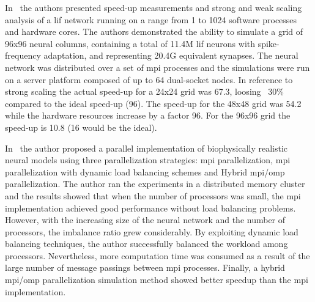 \documentclass[10pt,journal,compsoc]{IEEEtran}
\begin{document}
In~\cite{Pastorelli2015ScalingT1} the authors presented speed-up measurements and strong and weak scaling analysis of a \gls{lif} network running on a range from 1 to 1024 software processes and hardware cores. The authors demonstrated the ability to simulate a grid of 96x96 neural columns, containing a total of 11.4M \gls{lif} neurons with spike-frequency adaptation, and representing 20.4G equivalent synapses. The neural network was distributed over a set of \gls{mpi} processes and the simulations were run on a server platform composed of up to 64 dual-socket nodes. In reference to strong scaling the actual speed-up for a 24x24 grid was 67.3, loosing ~30\% compared to the ideal speed-up (96). The speed-up for the 48x48 grid was 54.2 while the hardware resources increase by a factor 96. For the 96x96 grid the speed-up is 10.8 (16 would be the ideal).

In~\cite{hu2012biophysically} the author proposed a parallel implementation of biophysically realistic neural models using three parallelization strategies: \gls{mpi} parallelization, \gls{mpi} parallelization with dynamic load balancing schemes and Hybrid \gls{mpi}/\gls{omp} parallelization. The author ran the experiments in a distributed memory cluster and the results showed that when the number of processors was small, the \gls{mpi} implementation achieved good performance without load balancing problems. However, with the increasing size of the neural network and the number of processors, the imbalance ratio grew considerably. By exploiting dynamic load balancing techniques, the author successfully balanced the workload among processors. Nevertheless, more computation time was consumed as a result of the large number of message passings between \gls{mpi} processes. Finally, a hybrid \gls{mpi}/\gls{omp} parallelization simulation method showed better speedup than the \gls{mpi} implementation.






















\end{document}
